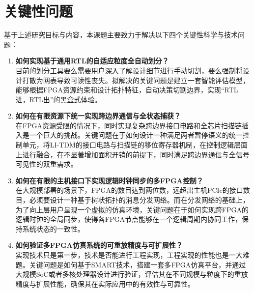 \section{关键性问题}

基于上述研究目标与内容，本课题主要致力于解决以下四个关键性科学与技术问题：

\begin{enumerate}

    \item \textbf{如何实现基于通用RTL的自适应粒度全自动划分？} \\
    目前的划分工具要么需要用户深入了解设计细节进行手动切割，要么强制将设计打散为网表导致可读性丧失。拟解决的关键问题是建立一套智能评估模型，能够根据FPGA资源约束和设计拓扑特征，自动决策切割边界，实现“RTL进，RTL出”的黑盒式体验。
    
    \item \textbf{如何在有限资源下统一实现跨边界通信与全状态捕获？} \\
    在FPGA资源受限的情况下，同时实现复杂跨边界接口电路和全芯片扫描链插入是一个巨大的挑战。关键问题在于如何设计一种满足两者暂停语义的统一控制单元，将LI-TDM的接口电路与扫描链的移位寄存器机制，在控制逻辑层面上进行融合，在不显著增加面积开销的前提下，同时满足跨边界通信与全信号可见性的双重需求。
    
    \item \textbf{如何在有限的主机接口下实现逻辑时钟同步的多FPGA控制？} \\
    在大规模部署的场景下，FPGA的数目达到两位数，远超出主机PCIe的接口数目，必须要设计一种基于树状拓扑的消息分发网络。而在分发网络的基础上，为了向上层用户呈现一个虚拟的仿真环境，关键问题在于如何实现跨FPGA的逻辑时钟的全局同步，使得各FPGA节点能够在一个逻辑周期内协同工作，保持系统状态的一致性。
    
    \item \textbf{如何验证多FPGA仿真系统的可重放精度与可扩展性？} \\
          实现技术只是第一步，技术是否能进行工程实现，工程实现的性能也是一大难题。关键问题是如何基于SMART技术，搭建一套多FPGA仿真平台，并通过大规模SoC或者多核处理器设计进行验证，评估其在不同规模与粒度下的重放精度与扩展性能，确保其在实际应用中的有效性与可靠性。
          
\end{enumerate}
